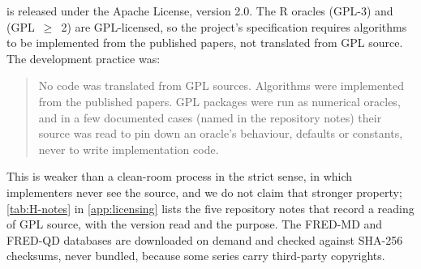  is released under the Apache License, version 2.0. %
The R oracles  (GPL-3) and  (GPL~$\geq$~2) are GPL-licensed, so the project's specification requires algorithms to be implemented from the published papers, not translated from GPL source. %
The development practice was:
\begin{quote}
No code was translated from GPL sources. Algorithms were implemented from the published papers. GPL packages were run as numerical oracles, and in a few documented cases (named in the repository notes) their source was read to pin down an oracle's behaviour, defaults or constants, never to write implementation code.
\end{quote}
This is weaker than a clean-room process in the strict sense, in which implementers never see the source, and we do not claim that stronger property; \cref{tab:H-notes} in \cref{app:licensing} lists the five repository notes that record a reading of GPL source, with the version read and the purpose. %
The FRED-MD and FRED-QD databases \citep{mccracken2016fredmd,mccracken2021fredqd} are downloaded on demand and checked against SHA-256 checksums, never bundled, because some series carry third-party copyrights. %
